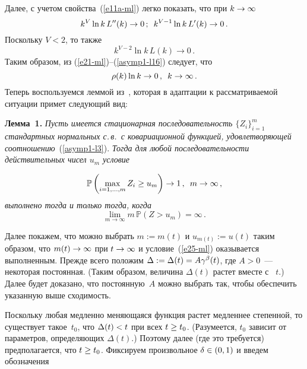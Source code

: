 \begin{multicols}{2}
Далее, с учетом  свойства~(\ref{e11a-ml})  легко показать, что при $k\hm\to \infty$
\begin{equation}
k^V \ln k \,L''(k)\to 0\,;\enskip  k^{V-1} \ln k\, L'(k)\to 0\,.
\label{asymp1-l14}
\end{equation}
Поскольку  $V<2$, то также
\begin{equation}
k^{V-2}\ln k \,L(k) \to 0\,. 
\label{asymp1-l16}
\end{equation}
Таким образом,  из (\ref{e21-ml})--(\ref{asymp1-l16})  следует, что
\begin{equation}
\rho(k)\ln k \to 0\,,\enskip k \to \infty\,. 
\label{asymp1-l3}
\end{equation}
Теперь воспользуемся леммой из~\cite{Leadbetter}, которая в
адап\-та\-ции к рассматриваемой ситуации примет следующий вид:

\smallskip

\noindent
\textbf{Лемма~1.} \textit{Пусть имеется стационарная последовательность
$\{Z_i\}_{i=1}^{m}$ стандартных нормальных с.\,в.\ с ковариационной
функцией, удовлетворяющей соотношению}~(\ref{asymp1-l3}). \textit{Тогда для
любой последовательности действительных чисел $u_m$ условие}

\vspace*{-2pt}

\noindent
\begin{eqnarray*}
\mathbb{P} \left( \max\limits_{i=1,\ldots,m} Z_i \geq u_m\right) \to 1\,,\enskip m \to \infty\,,
\end{eqnarray*}
\textit{выполнено тогда и только тогда, когда}
\begin{equation}
\lim_{m\to \infty} m\,\mathbb{P}(Z>u_m)  = \infty \,. 
\label{e25-ml}
\end{equation}

\smallskip

Далее покажем, что можно выбрать  $m:=m(t)$ и $u_{m(t)}:=u(t)$
таким образом, что $m(t)\hm\to \infty$ при $t\hm\to \infty$ и условие~(\ref{e25-ml}) 
оказывается выполненным. Прежде всего положим
$\Delta:=\Delta(t)\hm=A\gamma^\beta(t)$, где  $A>0$~--- некоторая
постоянная.  (Таким образом, величина $\Delta(t)$ растет  вместе с~ $t$.)  
Далее  будет доказано, что  постоянную~$A$ можно выбрать так, чтобы обеспечить 
указанную выше сходимость.

Поскольку любая медленно меняющаяся функция растет медленнее
степенной, то существует   такое~$t_0$, что $\Delta(t)\hm<t$ при всех
$t\hm\ge t_0$. (Разумеется, $t_0$ зависит от параметров, определяющих
$\Delta(t)$.) Поэтому далее (где это требуется) предполагается, что
$t\hm\ge t_0$.  Фиксируем произвольное $\delta \hm\in (0,1)$ и введем обозначения


\end{multicols}
